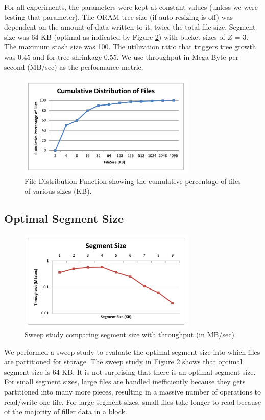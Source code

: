 \documentclass[conference]{IEEEtran}
\begin{document}
For all experiments, the parameters were kept at constant values (unless we were testing that parameter). 
The ORAM tree size (if auto resizing is off) was dependent on the amount of data written to it, twice the total file size. 
Segment size was 64 KB (optimal as indicated by Figure \ref{fig:segsize}) with bucket sizes of $Z$ = 3.  
The maximum stash size was 100. 
The utilization ratio that triggers tree growth was 0.45 and for tree shrinkage 0.55. 
We use throughput in Mega Byte per second (MB/sec) as the performance metric.

\begin{figure}
\begin{center}
\noindent\includegraphics[width=8.5cm]{510.pdf}
\caption{File Distribution Function showing the cumulative percentage of files of various sizes (KB).}
\label{fig:distfun}
\end{center}
\end{figure}

\subsection{Optimal Segment Size}
\begin{figure}
\begin{center}
\noindent\includegraphics[width=8.5cm]{520.pdf}
\caption{Sweep study comparing segment size with throughput (in MB/sec)}
\label{fig:segsize}
\end{center}
\end{figure}

We performed a sweep study to evaluate the optimal segment size into which files are partitioned for storage. The sweep study in Figure \ref{fig:segsize} shows that optimal segment size is 64 KB. It is not surprising that there is an optimal segment size. For small segment sizes, large files are handled inefficiently because they gets partitioned into many more pieces, resulting in a massive number of operations to read/write one file. For large segment sizes, small files take longer to read because of the majority of filler data in a block.
\end{document}
